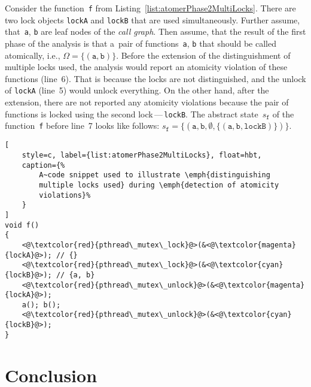 \begin{example}
    Consider the function~\texttt{f} from
    Listing~\ref{list:atomerPhase2MultiLocks}. There are two lock objects
    \texttt{lockA} and \texttt{lockB} that are used simultaneously.
    Further assume, that~\texttt{a}, \texttt{b} are leaf nodes of the
    \emph{call graph}. Then assume, that the result of the first
    phase of the analysis is that a~pair of functions~\texttt{a},
    \texttt{b} that should be called atomically, i.e., $ \Omega =
    {\{(\mathtt{a}, \mathtt{b})\}} $. Before the extension of
    the distinguishment of multiple locks used, the analysis
    would report an atomicity violation of these functions (line~6).
    That is because the locks are not distinguished, and the
    unlock of \texttt{lockA} (line~5) would unlock everything.
    On the other hand, after the extension, there are not reported
    any atomicity violations because the pair of functions is
    locked using the second lock\,---\,\texttt{lockB}. The abstract
    state~$ s_\mathtt{f} $ of the function~\texttt{f} before
    line~7 looks like follows: $ s_\mathtt{f} = \{{(\mathtt{a},
    \mathtt{b}, \emptyset, \{(\mathtt{a}, \mathtt{b},
    \mathtt{lockB})\})}\} $.
\end{example}

\begin{lstlisting}[
    style=c, label={list:atomerPhase2MultiLocks}, float=hbt,
    caption={%
        A~code snippet used to illustrate \emph{distinguishing
        multiple locks used} during \emph{detection of atomicity
        violations}%
    }
]
void f()
{
    <@\textcolor{red}{pthread\_mutex\_lock}@>(&<@\textcolor{magenta}{lockA}@>); // {}
    <@\textcolor{red}{pthread\_mutex\_lock}@>(&<@\textcolor{cyan}{lockB}@>); // {a, b}
    <@\textcolor{red}{pthread\_mutex\_unlock}@>(&<@\textcolor{magenta}{lockA}@>);
    a(); b();
    <@\textcolor{red}{pthread\_mutex\_unlock}@>(&<@\textcolor{cyan}{lockB}@>);
}
\end{lstlisting}



\chapter{Conclusion}
\label{chap:conc}

